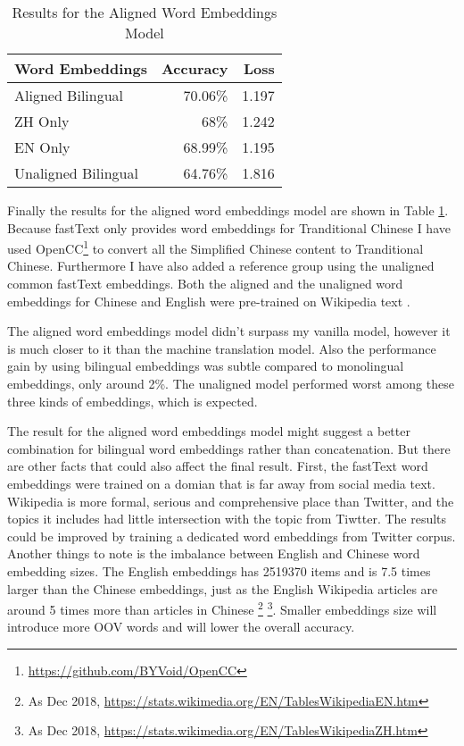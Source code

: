 \documentclass[11pt,a4paper]{article}
\begin{document}
\begin{table}[t]
  \begin{center}
  \begin{tabular}{|l|r|r|}
  \hline \bf Word Embeddings & \bf Accuracy & \bf Loss \\ \hline
  Aligned Bilingual & 70.06\% & 1.197 \\
  \hspace{0.5cm} ZH Only & 68\% & 1.242 \\
  \hspace{0.5cm} EN Only & 68.99\% & 1.195 \\
  Unaligned Bilingual & 64.76\% & 1.816 \\
  \hline
  \end{tabular}
  \end{center}
  \caption{\label{tab:cnn-results-table} Results for the Aligned Word Embeddings Model}
\end{table}

Finally the results for the aligned word embeddings model are shown in Table \ref{tab:cnn-results-table}. Because fastText only provides word embeddings for Tranditional Chinese I have used OpenCC\footnote{\url{https://github.com/BYVoid/OpenCC}} to convert all the Simplified Chinese content to Tranditional Chinese. Furthermore I have also added a reference group using the unaligned common fastText embeddings. Both the aligned and the unaligned word embeddings for Chinese and English were pre-trained on Wikipedia text \cite{bojanowski2017enriching}.

The aligned word embeddings model didn't surpass my vanilla model, however it is much closer to it than the machine translation model. Also the performance gain by using bilingual embeddings was subtle compared to monolingual embeddings, only around 2\%. The unaligned model performed worst among these three kinds of embeddings, which is expected.

The result for the aligned word embeddings model might suggest a better combination for bilingual word embeddings rather than concatenation. But there are other facts that could also affect the final result. First, the fastText word embeddings were trained on a domian that is far away from social media text. Wikipedia is more formal, serious and comprehensive place than Twitter, and the topics it includes had little intersection with the topic from Tiwtter. The results could be improved by training a dedicated word embeddings from Twitter corpus. Another things to note is the imbalance between English and Chinese word embedding sizes. The English embeddings has 2519370 items and is 7.5 times larger than the Chinese embeddings, just as the English Wikipedia articles are around 5 times more than articles in Chinese \footnote{As Dec 2018, \url{https://stats.wikimedia.org/EN/TablesWikipediaEN.htm}} \footnote{As Dec 2018, \url{https://stats.wikimedia.org/EN/TablesWikipediaZH.htm}}. Smaller embeddings size will introduce more OOV words and will lower the overall accuracy.
\end{document}
